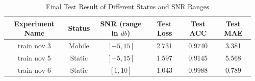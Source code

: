 \begin{table}[H]
    \centering
    \begin{tabular}{|c|c|c|c|c|c|}
        \hline
         Experiment Name& Status & SNR (range in \(db\)) & Test Loss & Test ACC & Test MAE\\
         \hline
         train nov 3 & Mobile & \([-5, 15]\) & 2.731 & 0.9740 & 3.381\\
         \hline
         train nov 5 & Static & \([-5, 15]\) & 1.597 & 0.9145 & 5.568\\
         \hline
         train nov 6 & Static & \([1, 10]\) & 1.043 & 0.9988 & 0.789\\
         \hline
    \end{tabular}
    \caption{Final Test Result of Different Status and SNR Ranges}
\end{table}


